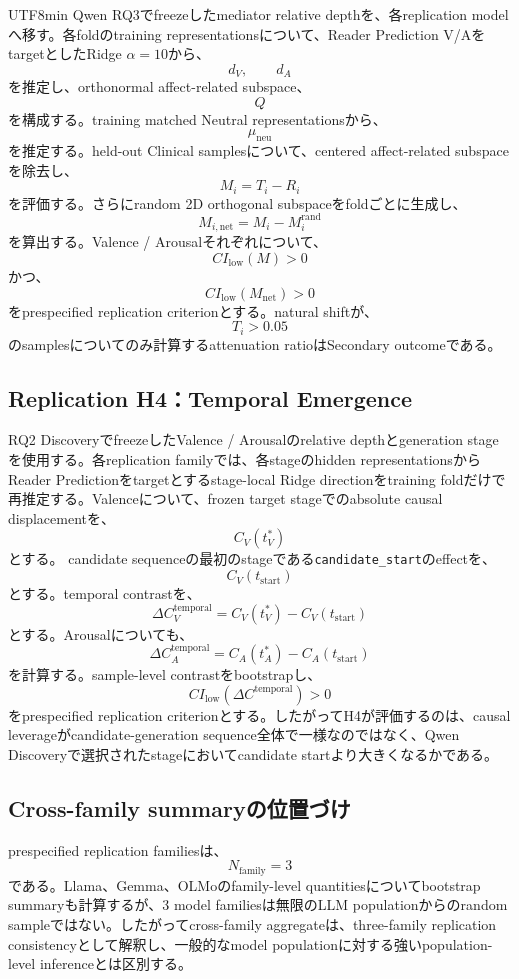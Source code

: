 \documentclass{article} %
\begin{document}
\begin{CJK*}{UTF8}{min}
Qwen RQ3でfreezeしたmediator relative depthを、各replication modelへ移す。各foldのtraining representationsについて、Reader Prediction V/AをtargetとしたRidge \(\alpha=10\)から、
\[
d_V,
\qquad
d_A
\]
を推定し、orthonormal affect-related subspace、
\[
Q
\]
を構成する。training matched Neutral representationsから、
\[
\mu_{\mathrm{neu}}
\]
を推定する。held-out Clinical samplesについて、centered affect-related subspaceを除去し、
\[
M_i=T_i-R_i
\]
を評価する。さらにrandom 2D orthogonal subspaceをfoldごとに生成し、
\[
M_{i,\mathrm{net}}
=
M_i-M_i^{\mathrm{rand}}
\]
を算出する。Valence / Arousalそれぞれについて、
\[
CI_{\mathrm{low}}(M)>0
\]
かつ、
\[
CI_{\mathrm{low}}(M_{\mathrm{net}})>0
\]
をprespecified replication criterionとする。natural shiftが、
\[
T_i>0.05
\]
のsamplesについてのみ計算するattenuation ratioはSecondary outcomeである。


\subsection{Replication H4：Temporal Emergence}

RQ2 DiscoveryでfreezeしたValence / Arousalのrelative depthとgeneration stageを使用する。各replication familyでは、各stageのhidden representationsからReader Predictionをtargetとするstage-local Ridge directionをtraining foldだけで再推定する。Valenceについて、frozen target stageでのabsolute causal displacementを、
\[
C_V(t_V^{*})
\]
とする。
candidate sequenceの最初のstageである\texttt{candidate\_start}のeffectを、
\[
C_V(t_{\mathrm{start}})
\]
とする。temporal contrastを、
\[
\Delta C_V^{\mathrm{temporal}}
=
C_V(t_V^{*})
-
C_V(t_{\mathrm{start}})
\]
とする。Arousalについても、
\[
\Delta C_A^{\mathrm{temporal}}
=
C_A(t_A^{*})
-
C_A(t_{\mathrm{start}})
\]
を計算する。sample-level contrastをbootstrapし、
\[
CI_{\mathrm{low}}
(
\Delta C^{\mathrm{temporal}}
)>0
\]
をprespecified replication criterionとする。したがってH4が評価するのは、causal leverageがcandidate-generation sequence全体で一様なのではなく、Qwen Discoveryで選択されたstageにおいてcandidate startより大きくなるかである。


\subsection{Cross-family summaryの位置づけ}

prespecified replication familiesは、
\[
N_{\mathrm{family}}=3
\]
である。Llama、Gemma、OLMoのfamily-level quantitiesについてbootstrap summaryも計算するが、3 model familiesは無限のLLM populationからのrandom sampleではない。したがってcross-family aggregateは、three-family replication consistencyとして解釈し、一般的なmodel populationに対する強いpopulation-level inferenceとは区別する。



\end{CJK*}
\end{document}
